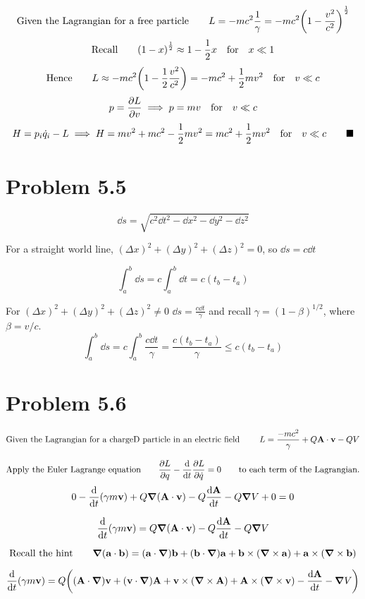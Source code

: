 \documentclass{article}
\begin{document}
\[ \text{Given the Lagrangian for a free particle}\qquad L=-mc^{2}\frac{1}{\gamma}=-mc^{2}\qty(1-\frac{v^2}{c^2})^{\frac{1}{2}} \]
\[ \text{Recall} \qquad \qty(1-x)^{\frac{1}{2}}\approx 1-\frac{1}{2}x \qq{for} x\ll 1 \]
\[ \text{Hence} \qquad L\approx -mc^{2} \qty(1-\frac{1}{2}\frac{v^2}{c^2})= -mc^2 + \frac{1}{2}mv^2 \qq{for} v\ll c\]
\[ p=\pdv{L}{v}\implies p=mv  \qq{for} v\ll c \]
\[ H= p_{i}\dot{q}_{i}-L\implies H=mv^2 +mc^2 -\frac{1}{2}mv^2=mc^2+\frac{1}{2}mv^2 \qq{for} v\ll c \qquad\blacksquare \]


 
\section*{Problem 5.5}

\[\dd s = \sqrt{c^2 \dd t^2-\dd x^2-\dd y^2-\dd z^2}\]

For a straight world line, $(\Delta x)^2+(\Delta y)^2+(\Delta z)^2=0$, so $\dd s = c\dd t$

\[\int_a^b\dd s = c\int_a^b\dd t=c(t_b-t_a)
\]

For  $(\Delta x)^2+(\Delta y)^2+(\Delta z)^2\ne 0$ $\dd s = \frac{c\dd t}{\gamma}$ and recall $\gamma=(1-\beta)^{1/2}$, where $\beta=v/c$.
\[\int_a^b\dd s = c\int_a^b\frac{c\dd t}{\gamma}=\frac{c(t_b-t_a)}{\gamma}\le c(t_b-t_a)
\]
 
\section*{Problem 5.6}

\[
\text{Given the Lagrangian for a chargeD particle in an electric field }\qquad L=\frac{-mc^2}{\gamma}  +Q\vb{A}\cdot \vb{v} -QV
\]

\[ \text{Apply the Euler Lagrange equation}\qquad \pdv{L}{q}-\dv{t} \pdv{L}{\dot{q}}=0 \qquad\text{to each term of the Lagrangian.}\]
\[0-\dv{t}(\gamma m \vb{v})+Q\grad{(\vb{A}\cdot\vb{v})} -Q\dv{\vb{A}}{t}-Q\grad{V}+0=0
\]

\[\dv{t}(\gamma m \vb{v})=Q\grad{(\vb{A}\cdot\vb{v})} -Q\dv{\vb{A}}{t}-Q\grad{V}
\]

\[\text{Recall the hint}\qquad\grad{(\vb{a}\cdot\vb{b})}=(\vb{a}\cdot\grad)\vb{b}+(\vb{b}\cdot\grad)\vb{a}+\vb{b}\times(\grad\times\vb{a})+\vb{a}\times(\grad\times\vb{b})
\]

\[\dv{t}(\gamma m \vb{v})=Q\qty((\vb{A}\cdot\grad)\vb{v}+(\vb{v}\cdot\grad)\vb{A}+\vb{v}\times(\grad\times\vb{A})+\vb{A}\times(\grad\times\vb{v}) -\dv{\vb{A}}{t}-\grad{V})
\]
\end{document}

